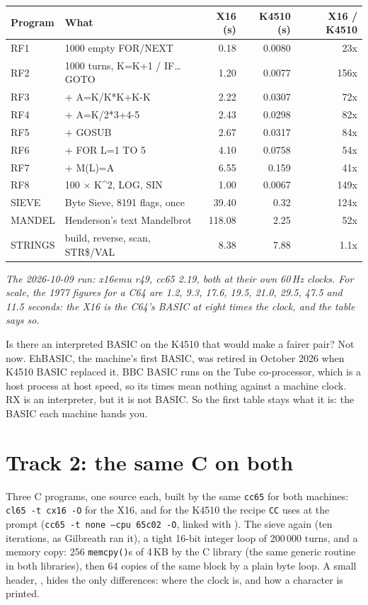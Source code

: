 \begin{center}
\footnotesize
\begin{tabular}{@{}l l r r r@{}}
\toprule
\textbf{Program} & \textbf{What} & \textbf{X16 (s)} & \textbf{K4510 (s)} & \textbf{X16 / K4510} \\
\midrule
RF1 & 1000 empty FOR/NEXT & 0.18 & 0.0080 & 23x \\
RF2 & 1000 turns, K=K+1 / IF\ldots GOTO & 1.20 & 0.0077 & 156x \\
RF3 & + A=K/K*K+K-K & 2.22 & 0.0307 & 72x \\
RF4 & + A=K/2*3+4-5 & 2.43 & 0.0298 & 82x \\
RF5 & + GOSUB & 2.67 & 0.0317 & 84x \\
RF6 & + FOR L=1 TO 5 & 4.10 & 0.0758 & 54x \\
RF7 & + M(L)=A & 6.55 & 0.159 & 41x \\
RF8 & 100 $\times$ K\^{}2, LOG, SIN & 1.00 & 0.0067 & 149x \\
SIEVE & Byte Sieve, 8191 flags, once & 39.40 & 0.32 & 124x \\
MANDEL & Henderson's text Mandelbrot & 118.08 & 2.25 & 52x \\
STRINGS & build, reverse, scan, STR\$/VAL & 8.38 & 7.88 & 1.1x \\
\bottomrule
\end{tabular}
\end{center}
\noindent\emph{The 2026-10-09 run: x16emu r49, cc65 2.19, both at their
own 60\,Hz clocks. For scale, the 1977 figures for a C64 are 1.2, 9.3,
17.6, 19.5, 21.0, 29.5, 47.5 and 11.5 seconds: the X16 is the C64's
BASIC at eight times the clock, and the table says so.}

Is there an interpreted BASIC on the K4510 that would make a
fairer pair? Not now. EhBASIC, the machine's first BASIC, was
retired in October 2026 when K4510 BASIC replaced it. BBC
BASIC runs on the Tube co-processor, which is a host process
at host speed, so its times mean nothing against a machine
clock. RX is an interpreter, but it is not BASIC. So the
first table stays what it is: the BASIC each machine hands
you.

\section{Track 2: the same C on both}
Three C programs, one source each, built by the same
\texttt{cc65} for both machines: \texttt{cl65 -t cx16 -O} for
the X16, and for the K4510 the recipe \texttt{CC} uses at the
prompt (\texttt{cc65 -t none --cpu 65c02 -O}, linked with
). The sieve again (ten iterations, as
Gilbreath ran it), a tight 16-bit integer loop of 200\,000
turns, and a memory copy: 256 \texttt{memcpy()}s of 4\,KB by
the C library (the same generic routine in both libraries),
then 64 copies of the same block by a plain byte loop. A small
header, , hides the only
differences: where the clock is, and how a character is
printed.

